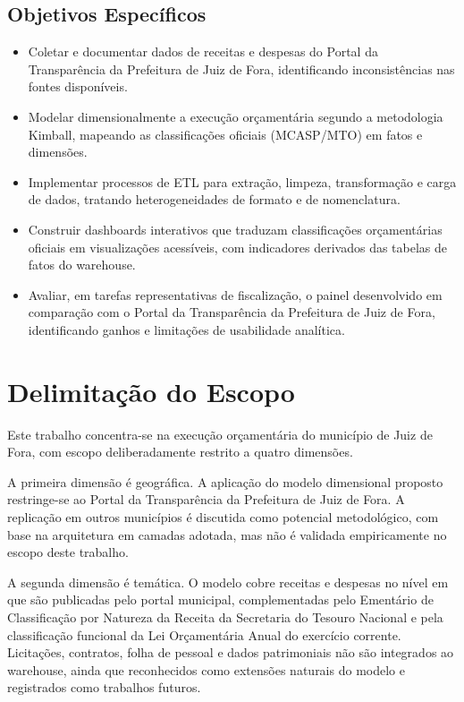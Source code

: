 \subsection*{Objetivos Específicos}

\begin{itemize}
    \item Coletar e documentar dados de receitas e despesas do Portal da Transparência da Prefeitura de Juiz de Fora, identificando inconsistências nas fontes disponíveis.
    \item Modelar dimensionalmente a execução orçamentária segundo a metodologia Kimball, mapeando as classificações oficiais (MCASP/MTO) em fatos e dimensões.
    \item Implementar processos de ETL para extração, limpeza, transformação e carga de dados, tratando heterogeneidades de formato e de nomenclatura.
    \item Construir dashboards interativos que traduzam classificações orçamentárias oficiais em visualizações acessíveis, com indicadores derivados das tabelas de fatos do warehouse.
    \item Avaliar, em tarefas representativas de fiscalização, o painel desenvolvido em comparação com o Portal da Transparência da Prefeitura de Juiz de Fora, identificando ganhos e limitações de usabilidade analítica.
\end{itemize}

\section{Delimitação do Escopo}
\label{sec:escopo}

Este trabalho concentra-se na execução orçamentária do município de Juiz de Fora, com escopo deliberadamente restrito a quatro dimensões.

A primeira dimensão é geográfica. A aplicação do modelo dimensional proposto restringe-se ao Portal da Transparência da Prefeitura de Juiz de Fora. A replicação em outros municípios é discutida como potencial metodológico, com base na arquitetura em camadas adotada, mas não é validada empiricamente no escopo deste trabalho.

A segunda dimensão é temática. O modelo cobre receitas e despesas no nível em que são publicadas pelo portal municipal, complementadas pelo Ementário de Classificação por Natureza da Receita da Secretaria do Tesouro Nacional e pela classificação funcional da Lei Orçamentária Anual do exercício corrente. Licitações, contratos, folha de pessoal e dados patrimoniais não são integrados ao warehouse, ainda que reconhecidos como extensões naturais do modelo e registrados como trabalhos futuros.

